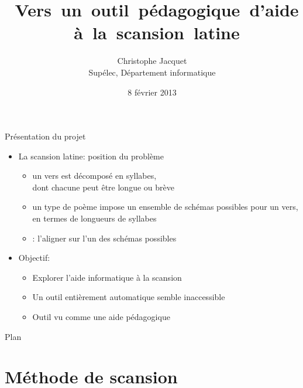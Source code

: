 \documentclass{beamer}
\title{\mbox{ Vers un outil pédagogique d'aide à la scansion latine} }
\author{Christophe Jacquet\\
{\footnotesize Supélec, Département informatique}
}
\date{8 février 2013}
\begin{document}
\maketitle


\begin{frame}{Présentation du projet}

\begin{itemize}
\item La scansion latine: position du problème

\begin{itemize}
\item un vers est décomposé en syllabes,\\ dont chacune peut être longue ou brève
\item un type de poème impose un ensemble de schémas possibles pour un vers, en termes de longueurs de syllabes
\item {}: l'aligner sur l'un des schémas possibles
\end{itemize}

\vfill

\item Objectif:

\begin{itemize}
\item Explorer l'aide informatique à la scansion
\item Un outil entièrement automatique semble inaccessible
\item Outil vu comme une aide pédagogique
\end{itemize}

\end{itemize}

\end{frame} %


\begin{frame}{Plan}

\tableofcontents

\end{frame} %


\section{Méthode de scansion}
\end{document}
